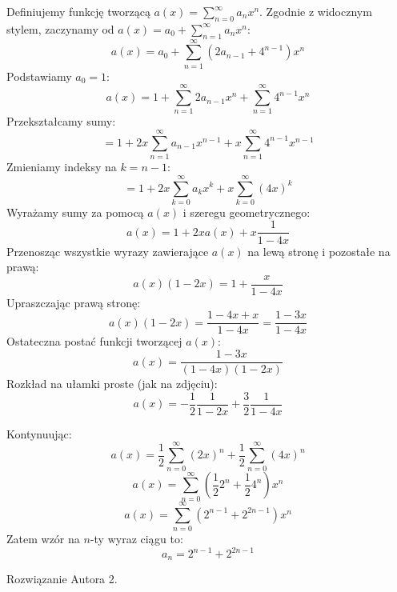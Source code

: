 \documentclass{mwart}
\begin{document}
\begin{mdframed}
    Definiujemy funkcję tworzącą $a(x) = \sum_{n=0}^{\infty} a_n x^n$.
    Zgodnie z widocznym stylem, zaczynamy od $a(x) = a_0 + \sum_{n=1}^{\infty} a_n x^n$:
    $$ a(x) = a_0 + \sum_{n=1}^{\infty} (2a_{n-1} + 4^{n-1}) x^n $$
    Podstawiamy $a_0 = 1$:
    $$ a(x) = 1 + \sum_{n=1}^{\infty} 2a_{n-1} x^n + \sum_{n=1}^{\infty} 4^{n-1} x^n $$
    Przekształcamy sumy:
    $$ = 1 + 2x \sum_{n=1}^{\infty} a_{n-1} x^{n-1} + x \sum_{n=1}^{\infty} 4^{n-1} x^{n-1} $$
    Zmieniamy indeksy na $k=n-1$:
    $$ = 1 + 2x \sum_{k=0}^{\infty} a_k x^k + x \sum_{k=0}^{\infty} (4x)^k $$
    Wyrażamy sumy za pomocą $a(x)$ i szeregu geometrycznego:
    $$ a(x) = 1 + 2x a(x) + x \frac{1}{1-4x} $$
    Przenosząc wszystkie wyrazy zawierające $a(x)$ na lewą stronę i pozostałe na prawą:
    $$ a(x) (1 - 2x) = 1 + \frac{x}{1-4x} $$
    Upraszczając prawą stronę:
    $$ a(x) (1 - 2x) = \frac{1-4x+x}{1-4x} = \frac{1-3x}{1-4x} $$
    Ostateczna postać funkcji tworzącej $a(x)$:
    $$ a(x) = \frac{1-3x}{(1-4x)(1-2x)} $$
    Rozkład na ułamki proste (jak na zdjęciu):
    $$ a(x) = -\frac{1}{2} \frac{1}{1-2x} + \frac{3}{2} \frac{1}{1-4x} $$

    Kontynuując:
    $$ a(x) = \frac{1}{2} \sum_{n=0}^{\infty} (2x)^n + \frac{1}{2} \sum_{n=0}^{\infty} (4x)^n $$
    $$ a(x) = \sum_{n=0}^{\infty} \left( \frac{1}{2} 2^n + \frac{1}{2} 4^n \right) x^n $$
    $$ a(x) = \sum_{n=0}^{\infty} (2^{n-1} + 2^{2n-1}) x^n $$
    Zatem wzór na $n$-ty wyraz ciągu to:
    $$ a_n = 2^{n-1} + 2^{2n-1} $$
\end{mdframed}
\begin{mdframed}
    Rozwiązanie Autora 2.
\end{mdframed}
\end{document}
